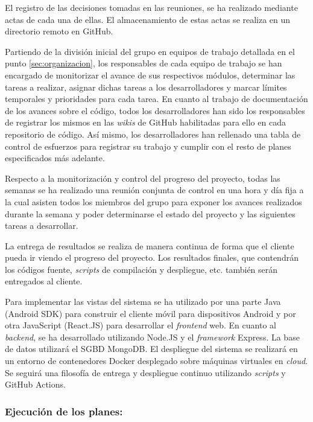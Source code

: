 \documentclass{article}
\begin{document}
El registro de las decisiones tomadas en las reuniones, se ha realizado mediante actas de cada una de ellas. El almacenamiento de estas actas se realiza en un directorio remoto en GitHub.

Partiendo de la división inicial del grupo en equipos de trabajo detallada en el punto \ref{sec:organizacion}, los responsables de cada equipo de trabajo se han encargado de monitorizar el avance de sus respectivos módulos, determinar las tareas a realizar, asignar dichas tareas a los desarrolladores y marcar límites temporales y prioridades para cada tarea. En cuanto al trabajo de documentación de los avances sobre el código, todos los desarrolladores han sido los responsables de registrar los mismos en las \textit{wikis} de GitHub habilitadas para ello en cada repositorio de código. Así mismo, los desarrolladores han rellenado una tabla de control de esfuerzos para registrar su trabajo y cumplir con el resto de planes especificados más adelante.

\pagebreak

Respecto a la monitorización y control del progreso del proyecto, todas las semanas se ha realizado una reunión conjunta de control en una hora y día fija a la cual asisten todos los miembros del grupo para exponer los avances realizados durante la semana y poder determinarse el estado del proyecto y las siguientes tareas a desarrollar.

La entrega de resultados se realiza de manera continua de forma que el cliente pueda ir viendo el progreso del proyecto. Los resultados finales, que contendrán los códigos fuente, \textit{scripts} de compilación y despliegue, etc. también serán entregados al cliente.

Para implementar las vistas del sistema se ha utilizado por una parte Java (Android SDK) para construir el cliente móvil para dispositivos Android y por otra JavaScript (React.JS) para desarrollar el \textit{frontend} web. En cuanto al \textit{backend}, se ha desarrollado utilizando Node.JS y el \textit{framework} Express. La base de datos utilizará el SGBD MongoDB. El despliegue del sistema se realizará en un entorno de contenedores Docker desplegado sobre máquinas virtuales en \textit{cloud}. Se seguirá una filosofía de entrega y despliegue continuo utilizando \textit{scripts} y GitHub Actions.

\subsubsection*{Ejecución de los planes:}
\end{document}
